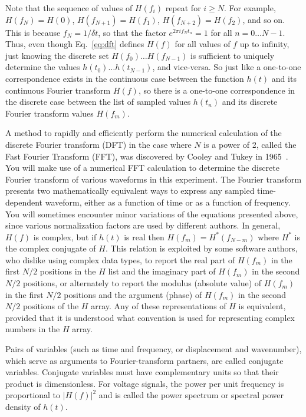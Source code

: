 \documentclass{revtex4}
\begin{document}
Note that the sequence of values of $H(f_i)$ repeat for $i\ge N$.  For
example, $H(f_N) = H(0)$, $H(f_{N+1}) = H(f_1)$, $H(f_{N+2}) = H(f_2)$, and so
on.  This is because $f_N = 1/\delta t$, so that the factor
$e^{2\pi i f_N t_n} = 1$ for all $n=0\ldots N-1$.  Thus, even though 
Eq.~\ref{eq:dft} defines $H(f)$ for all values of $f$ up to infinity, just
knowing the discrete set $H(f_0)\ldots H(f_{N-1})$ is sufficient to uniquely
determine the values $h(t_0)\ldots h(t_{N-1})$, and vice-versa.  So just
like a one-to-one correspondence exists in the continuous case between the
function $h(t)$ and its continuous Fourier transform $H(f)$, so there is a
one-to-one correspondence in the discrete case between the list of sampled
values $h(t_n)$ and its discrete Fourier transform values $H(f_m)$.

A method to rapidly and efficiently perform the numerical calculation of
the discrete Fourier transform (DFT) in the case where $N$ is a power of 2,
called the Fast Fourier Transform (FFT), was discovered by Cooley and Tukey
in 1965~\cite{Cooley65}.  You will make
use of a numerical FFT calculation to determine the discrete Fourier transform
of various waveforms in this experiment.  The Fourier transform presents two
mathematically equivalent ways to express any sampled time-dependent waveform,
either as a function of time or as a function of frequency. You will
sometimes encounter minor variations of the equations presented above, since
various normalization factors are used by different authors.  In general,
$H(f)$ is complex, but if $h(t)$ is real then $H(f_m) = H^*(f_{N-m})$ where
$H^*$ is the complex conjugate of $H$.  This relation is exploited by some
software authors, who dislike using complex data types, to report the real
part of $H(f_m)$ in the first $N/2$ positions in the $H$ list and the
imaginary part of $H(f_m)$ in the second $N/2$ positions, or alternately
to report the modulus (absolute value) of $H(f_m)$ in the first $N/2$
positions and the argument (phase) of $H(f_m)$ in the second $N/2$ positions
of the $H$ array.  Any of these representations of $H$ is equivalent,
provided that it is understood what convention is used for representing
complex numbers in the $H$ array.

Pairs of variables (such as time and frequency, or displacement and
wavenumber), which serve as arguments to Fourier-transform partners, are
called conjugate variables.  Conjugate variables must have complementary
units so that their product is dimensionless.
For voltage signals, the power per unit frequency is proportional to
$|H(f)|^2$ and is called the power spectrum or spectral power density of
$h(t)$.
\end{document}
